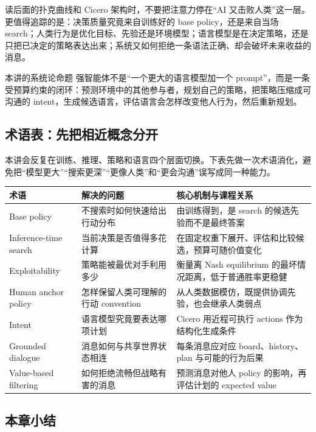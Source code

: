 \documentclass[a4paper]{article}
\begin{document}
读后面的扑克曲线和 Cicero 架构时，不要把注意力停在“AI 又击败人类”这一层。更值得追踪的是：决策质量究竟来自训练好的 base policy，还是来自当场 search；人类行为是优化目标、先验还是环境模型；语言模型是在决定策略，还是只把已决定的策略表达出来；系统又如何拒绝一条语法正确、却会破坏未来收益的消息。

\begin{importantbox}{本讲的系统论命题}
强智能体不是“一个更大的语言模型加一个 prompt”，而是一条受预算约束的闭环：预测环境中的其他参与者，规划自己的策略，把策略压缩成可沟通的 intent，生成候选语言，评估语言会怎样改变他人行为，然后重新规划。
\end{importantbox}

\subsection{术语表：先把相近概念分开}

本讲会反复在训练、推理、策略和语言四个层面切换。下表先做一次术语消化，避免把“模型更大”“搜索更深”“更像人类”和“更会沟通”误写成同一种能力。

\begin{longtable}{L{0.23\textwidth}L{0.30\textwidth}L{0.37\textwidth}}
\toprule
术语 & 解决的问题 & 核心机制与课程关系 \\
\midrule
Base policy & 不搜索时如何快速给出行动分布 & 由训练得到，是 search 的候选先验而不是最终答案 \\
Inference-time search & 当前决策是否值得多花计算 & 在固定权重下展开、评估和比较候选，预算可随价值变化 \\
Exploitability & 策略能被最优对手利用多少 & 衡量离 Nash equilibrium 的最坏情况距离，低于普通胜率更稳健 \\
Human anchor policy & 怎样保留人类可理解的行动 convention & 从人类数据模仿，既提供协调先验，也会继承人类弱点 \\
Intent & 语言模型究竟要表达哪项计划 & Cicero 用近程可执行 actions 作为结构化生成条件 \\
Grounded dialogue & 消息如何与共享世界状态相连 & 每条消息应对应 board、history、plan 与可能的行为后果 \\
Value-based filtering & 如何拒绝流畅但战略有害的消息 & 预测消息对他人 policy 的影响，再评估计划的 expected value \\
\bottomrule
\end{longtable}

\subsection{本章小结}
\end{document}
